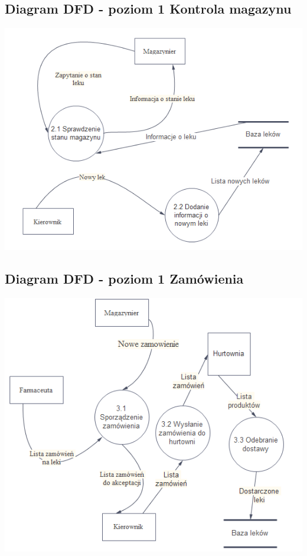 \documentclass[a4paper, 11pt]{article}
\begin{document}
	\subsection{Diagram DFD - poziom 1 Kontrola magazynu}
		\includegraphics[scale=1]{kontrolaMagazynu.PNG} 
		
	\subsection{Diagram DFD - poziom 1 Zamówienia}
		\includegraphics[scale=1]{zamowienia3.PNG} 
		
\end{document}
